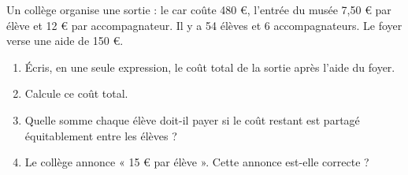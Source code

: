 \documentclass[a4paper, 10pt]{article}
\begin{document}
{\begin{exercicebox}[
    \AMCOpen{
        contentcommand=nodata,
        answer=\usebox{\thbox}
    }{\mauvaise{0}\bareme{0}\mauvaise{1}\bareme{1}\bonne[2]{2}\bareme{2}}]
    Un collège organise une sortie : le car coûte 480 €, l'entrée du musée 7,50 € par élève et 12 € par accompagnateur. Il y a 54 élèves et 6 accompagnateurs. Le foyer verse une aide de 150 €.
    \begin{enumerate}
        \item Écris, en une seule expression, le coût total de la sortie après l'aide du foyer.
        \item Calcule ce coût total.
        \item Quelle somme chaque élève doit-il payer si le coût restant est partagé équitablement entre les élèves ?
        \item Le collège annonce « 15 € par élève ». Cette annonce est-elle correcte ?
    \end{enumerate}
\end{exercicebox}



}   
\end{document}
